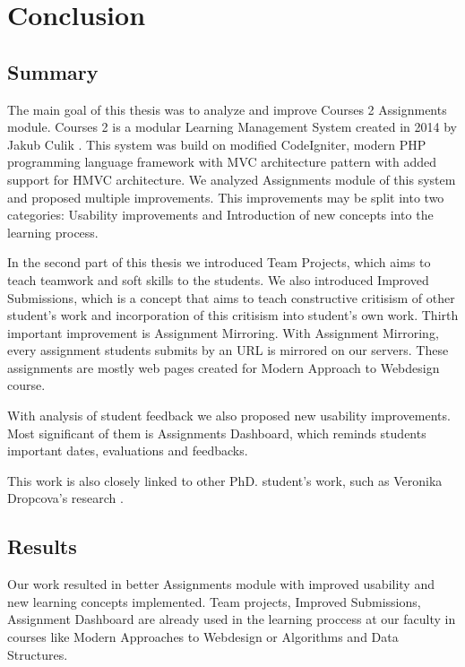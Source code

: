 \chapter*{Conclusion}

\section*{Summary}

The main goal of this thesis was to analyze and improve Courses 2 Assignments module. Courses 2 is a modular Learning Management System created in 2014 by Jakub Culik \cite{culik}. This system was build on modified CodeIgniter, modern PHP programming language framework with MVC architecture pattern with added support for HMVC architecture. We analyzed Assignments module of this system and proposed multiple improvements. This improvements may be split into two categories: Usability improvements and Introduction of new concepts into the learning process.

In the second part of this thesis we introduced Team Projects, which aims to teach teamwork and soft skills to the students. We also introduced Improved Submissions, which is a concept that aims to teach constructive critisism of other student's work and incorporation of this critisism into student's own work. Thirth important improvement is Assignment Mirroring. With Assignment Mirroring, every assignment students submits by an URL is mirrored on our servers. These assignments are mostly web pages created for Modern Approach to Webdesign course.

With analysis of student feedback we also proposed new usability improvements. Most significant of them is Assignments Dashboard, which reminds students important dates, evaluations and feedbacks.

This work is also closely linked to other PhD. student's work, such as Veronika Dropcova's research \cite{dropcova}.

\section*{Results}
Our work resulted in better Assignments module with improved usability and new learning concepts implemented. Team projects, Improved Submissions, Assignment Dashboard are already used in the learning proccess at our faculty in courses like Modern Approaches to Webdesign or Algorithms and Data Structures.

